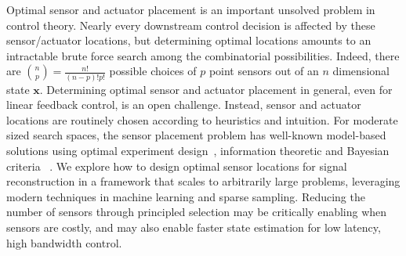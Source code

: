 \documentclass[letterpaper]{IEEEtran}
\newcommand{\bx}{\mathbf{x}}
\begin{document}
Optimal sensor and actuator placement is an important unsolved problem in control theory.  
Nearly every downstream control decision is affected by these sensor/actuator locations, but determining optimal locations amounts to an intractable brute force search among the combinatorial possibilities.
Indeed, there are ${n\choose p}=\frac{n!}{(n-p)!p!}$ possible choices of $p$ point sensors out of an $n$ dimensional state $\bx$.  
Determining optimal sensor and actuator placement in general, even for linear feedback control, is an open challenge.  
Instead, sensor and actuator locations are routinely chosen according to heuristics and intuition.  
For moderate sized search spaces, the sensor placement problem has well-known model-based solutions using optimal experiment design~\cite{Boyd2004convexbook,Joshi2009ieee}, information theoretic and Bayesian criteria~\cite{Caselton1984spl,Krause2008jmlr,Lindley1956ams,Sebastiani2000jrss,Paninski2005nc} .
We explore how to design optimal sensor locations for signal reconstruction in a framework that scales to arbitrarily large problems, leveraging modern techniques in machine learning and sparse sampling. 
Reducing the number of sensors through principled selection may be critically enabling when sensors are costly, and may also enable faster state estimation for low latency, high bandwidth control. 
\end{document}
